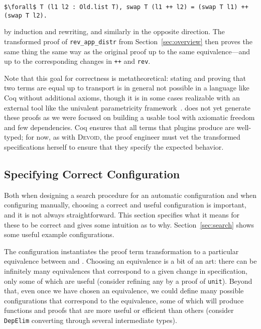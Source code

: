 \begin{lstlisting}
$\forall$ T (l1 l2 : Old.list T), swap T (l1 ++ l2) = (swap T l1) ++ (swap T l2).
\end{lstlisting}
by induction and rewriting, and similarly in the opposite direction.
The transformed proof of \lstinline{rev_app_distr} from Section~\ref{sec:overview} then proves the same thing the same way
as the original proof up to the same equivalence---and up to the corresponding changes in \lstinline{++}
and \lstinline{rev}.

Note that this goal for correctness is metatheoretical:
stating and proving that two terms are equal up to transport is in general not possible in a language like Coq
without additional axioms, though it is in some cases realizable with an external tool like the
univalent parametricity framework~\cite{tabareau2017equivalences}.
\toolname does not yet generate these proofs as we were focused on building a usable tool with axiomatic freedom and few dependencies.
Coq ensures that all terms that plugins produce are well-typed; for now, as with \textsc{Devoid}, the proof engineer must vet the transformed
specifications herself to ensure that they specify the expected behavior.

\subsection{Specifying Correct Configuration}
\label{sec:art}

Both when designing a search procedure for an automatic configuration and when
configuring \toolname manually, choosing a correct and useful configuration is important,
and it is not always straightforward. This section specifies what it means for these
to be correct and gives some intuition as to why.
Section~\ref{sec:search} shows some useful example configurations.

The configuration instantiates the proof term transformation to a particular equivalence between \A and \B.
Choosing an equivalence is a bit of an art:
there can be infinitely many equivalences that correspond to a 
given change in specification, only some of which are useful (consider refining any \A by a proof of \lstinline{unit}).
Beyond that, even once we have chosen an equivalence, we could define many possible configurations that correspond
to the equivalence, some of which will produce functions and proofs that are more useful or efficient than others
(consider \lstinline{DepElim} converting through several intermediate types).

